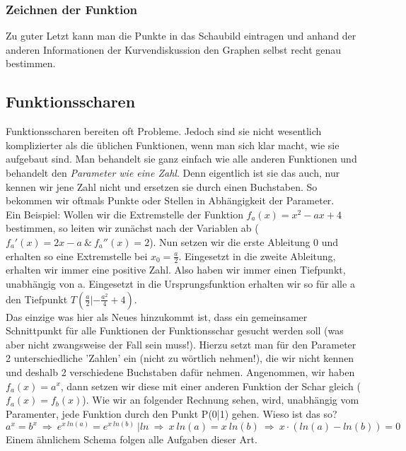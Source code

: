 
\subsubsection{Zeichnen der Funktion}
	Zu guter Letzt kann man die Punkte in das Schaubild eintragen und anhand der
	anderen Informationen der Kurvendiskussion den Graphen selbst recht genau
	bestimmen.


\subsection{Funktionsscharen}
	Funktionsscharen bereiten oft Probleme. Jedoch sind sie nicht wesentlich
	komplizierter als die üblichen Funktionen, wenn man sich klar macht, wie sie
	aufgebaut sind. Man behandelt sie ganz einfach wie alle anderen Funktionen und
	behandelt den \textit{Parameter wie eine Zahl}. Denn eigentlich ist sie das
	auch, nur kennen wir jene Zahl nicht und ersetzen sie durch einen Buchstaben.
	So bekommen wir oftmals Punkte oder Stellen in Abhängigkeit der Parameter. \\
	Ein Beispiel: Wollen wir die Extremstelle der Funktion \(f_a(x)=x^2-ax+4\)
	bestimmen, so leiten wir zunächst nach der Variablen ab (\(f_a'(x)=2x-a \ \& \
	f_a''(x)=2\)). Nun setzen wir die erste Ableitung 0 und erhalten so eine
	Extremstelle bei \(x_0=\frac{a}{2}\). Eingesetzt in die zweite Ableitung,
	erhalten wir immer eine positive Zahl. Also haben wir immer einen Tiefpunkt,
	unabhängig von a. Eingesetzt in die Ursprungsfunktion erhalten wir so für alle
	a den Tiefpunkt \(T(\frac{a}{2}|-\frac{a^2}{4}+4)\).\\
	Das einzige was hier als Neues hinzukommt ist, dass ein gemeinsamer
	Schnittpunkt für alle Funktionen der Funktionsschar gesucht werden soll (was
	aber nicht zwangsweise der Fall sein muss!). Hierzu setzt man für den
	Parameter 2 unterschiedliche 'Zahlen' ein (nicht zu wörtlich nehmen!), die wir
	nicht kennen und deshalb 2 verschiedene Buchstaben dafür nehmen.  Angenommen,
	wir haben \(f_a(x)=a^x\), dann setzen wir diese mit einer anderen Funktion der
	Schar gleich (\(f_a(x)=f_b(x)\)). Wie wir an folgender Rechnung sehen, wird,
	unabhängig vom Paramenter, jede Funktion durch den Punkt P(0|1) gehen. Wieso
	ist das so?
	\[a^x=b^x\ \Rightarrow\ e^{x\ ln(a)}=e^{x\ ln(b)} \ |ln\
	\Rightarrow\ x\ ln(a)=x\ ln(b)\ \Rightarrow\ x\cdot (ln(a)-ln(b))=0\]
	Einem ähnlichem Schema folgen alle Aufgaben dieser Art.

